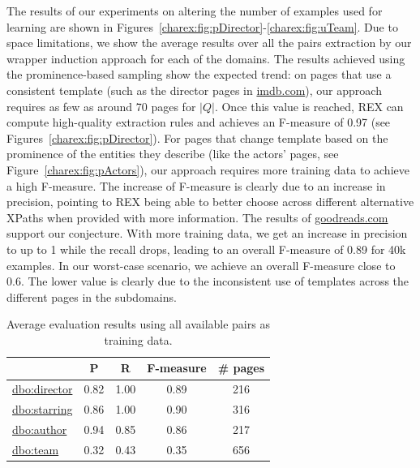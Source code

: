 The results of our experiments on altering the number of examples used for learning are shown in Figures~\ref{charex:fig:pDirector}-\ref{charex:fig:uTeam}. 
Due to space limitations, we show the average results over all the pairs extraction by our wrapper induction approach for each of the domains.
The results achieved using the prominence-based sampling show the expected trend: on pages that use a consistent template (such as the director pages in \url{imdb.com}), our approach requires as few as around 70 pages for $|Q|$. 
Once this value is reached, REX can compute high-quality extraction rules and achieves an F-measure of 0.97 (see Figures~\ref{charex:fig:pDirector}).
For pages that change template based on the prominence of the entities they describe (like the actors' pages, see Figure~\ref{charex:fig:pActors}), our approach requires more training data to achieve a high F-measure.
The increase of F-measure is clearly due to an increase in precision, pointing to REX being able to better choose across different alternative XPaths when provided with more information.
The results of \url{goodreads.com} support our conjecture. 
With more training data, we get an increase in precision to up to 1 while the recall drops, leading to an overall F-measure of 0.89 for 40k examples.
In our worst-case scenario, we achieve an overall F-measure close to 0.6.
The lower value is clearly due to the inconsistent use of templates across the different pages in the subdomains.

\begin{table}[htb]
\centering
\caption{Average evaluation results using all available pairs as training data.} 
\begin{tabular}{lcccc}
\toprule
  &  P & R & F-measure & \# pages \\
\midrule
\url{dbo:director}  & 0.82 & 1.00 & 0.89 & 216\\
\url{dbo:starring}  & 0.86 & 1.00 & 0.90 & 316\\
\url{dbo:author}    & 0.94 & 0.85 & 0.86 & 217\\
\url{dbo:team}      & 0.32 & 0.43 & 0.35 & 656\\
\bottomrule
\end{tabular}
\label{tab:overall}
\end{table}


